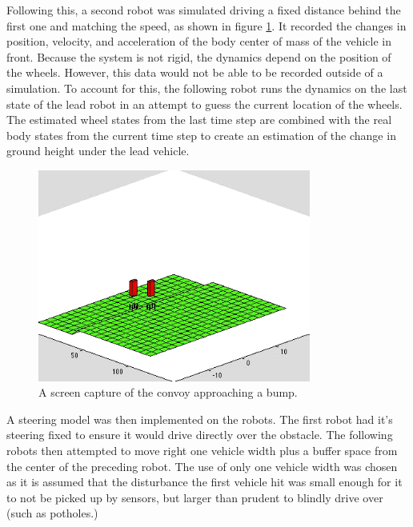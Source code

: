Following this, a second robot was simulated driving a fixed distance behind the first one and matching the speed, as shown in figure \ref{fig:naive_convoy}. It recorded the changes in position, velocity, and acceleration of the body center of mass of the vehicle in front. Because the system is not rigid, the dynamics depend on the position of the wheels. However, this data would not be able to be recorded outside of a simulation. To account for this, the following robot runs the dynamics on the last state of the lead robot in an attempt to guess the current location of the wheels. The estimated wheel states from the last time step are combined with the real body states from the current time step to create an estimation of the change in ground height under the lead vehicle.

\begin{figure}[t]
	\centering
	\includegraphics[width=0.8\textwidth]{figures/naive_convoy.png}
	\caption{A screen capture of the convoy approaching a bump.}
	\label{fig:naive_convoy}
\end{figure}

A steering model was then implemented on the robots. The first robot had it's steering fixed to ensure it would drive directly over the obstacle. The following robots then attempted to move right one vehicle width plus a buffer space from the center of the preceding robot. The use of only one vehicle width was chosen as it is assumed that the disturbance the first vehicle hit was small enough for it to not be picked up by sensors, but larger than prudent to blindly drive over (such as potholes.)

